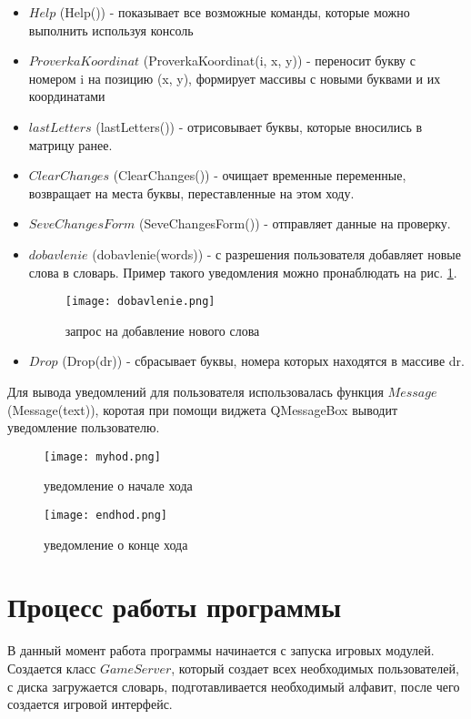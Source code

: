 \documentclass[a4paper,14pt]{article}
\begin{document}
	\begin {itemize}
	\item $Help$ (Help()) - показывает все возможные команды, которые можно выполнить используя консоль
	\item $ProverkaKoordinat$ (ProverkaKoordinat(i, x, y)) - переносит букву с номером i на позицию (x, y), формирует массивы с новыми буквами и их координатами	
	\item $lastLetters$ (lastLetters()) - отрисовывает буквы, которые вносились в матрицу ранее.
	\item $ClearChanges$ (ClearChanges()) - очищает временные переменные, возвращает на места буквы, переставленные на этом ходу.
	\item $SeveChangesForm$ (SeveChangesForm()) - отправляет данные на проверку.
	\item $dobavlenie$ (dobavlenie(words)) - с разрешения пользователя добавляет новые слова в словарь. Пример такого уведомления можно пронаблюдать на рис. \ref{img:dob}.
	\begin{figure}[bhtp]
		\centering
		\texttt{[image: dobavlenie.png]}
		\caption{запрос на добавление нового слова}
		\label{img:dob}
	\end{figure}
	\item $Drop$ (Drop(dr)) - сбрасывает буквы, номера которых находятся в массиве dr.
	\end {itemize}
	
	Для вывода уведомлений для пользователя использовалась функция $Message$ (Message(text)), коротая при помощи виджета QMessageBox выводит уведомление пользователю.
	\begin{figure}[H]
		\centering
		\texttt{[image: myhod.png]}
		\caption{уведомление о начале хода}
	\end{figure}
	\begin{figure}[H]
		\centering
		\texttt{[image: endhod.png]}
		\caption{уведомление о конце хода}
	\end{figure}


\section{Процесс работы программы}
	В данный момент работа программы начинается с запуска игровых модулей. Создается класс $GameServer$, который создает всех необходимых пользователей, с диска загружается словарь, подготавливается необходимый алфавит, после чего создается игровой интерфейс.
\end{document}
